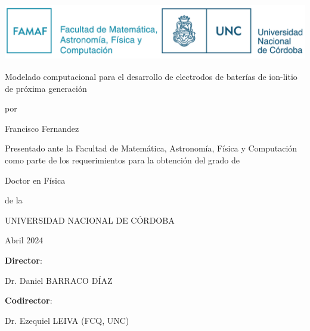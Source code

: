 \thispagestyle{empty}

\begin{center}

    \includegraphics[height=2.5cm]{Caratula/logo.png}

    \vspace{1cm}

    {\LARGE Modelado computacional para el desarrollo de electrodos de baterías de ion-litio de próxima generación}

    \vspace{0.5cm}
    por
    \vspace{0.5cm}

    {\Large Francisco Fernandez}

    \vspace{0.5cm}

    Presentado ante la Facultad de Matemática, Astronomía, Física y Computación 
    como parte de los requerimientos para la obtención del grado de

    \vspace{0.5cm}

    {\Large Doctor en Física}

    \vspace{0.5cm}
    de la

    UNIVERSIDAD NACIONAL DE CÓRDOBA

    \vspace{0.5cm}

    Abril 2024

\end{center}

\vspace{0.5cm}

\textbf{Director}: 

\hspace{1.5cm} Dr. Daniel BARRACO DÍAZ

\textbf{Codirector}: 

\hspace{1.5cm} Dr. Ezequiel LEIVA (FCQ, UNC)

\vspace{0.25cm}

